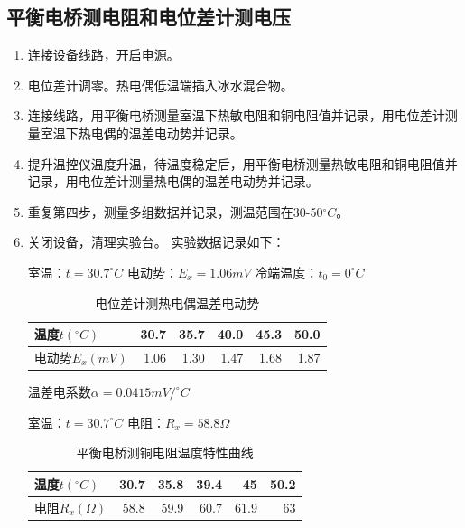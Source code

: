 \documentclass[11pt]{article}
\begin{document}
\subsection{平衡电桥测电阻和电位差计测电压}
\begin{enumerate}
    \item 连接设备线路，开启电源。
    \item 电位差计调零。热电偶低温端插入冰水混合物。
    \item 连接线路，用平衡电桥测量室温下热敏电阻和铜电阻值并记录，用电位差计测量室温下热电偶的温差电动势并记录。
    \item 提升温控仪温度升温，待温度稳定后，用平衡电桥测量热敏电阻和铜电阻值并记录，用电位差计测量热电偶的温差电动势并记录。
    \item 重复第四步，测量多组数据并记录，测温范围在30-50$^{\circ}C$。
    \item 关闭设备，清理实验台。
    \newline 实验数据记录如下：
   \begin{table}[H]
     \centering
     \caption{电位差计测热电偶温差电动势}
     室温：$t=30.7^{\circ}C$ \qquad 电动势：$E_{x}=1.06mV$ \qquad 冷端温度：$t_{0}=0^{\circ}C$
       \begin{center}
           \begin{tabular}{|l|r|r|r|r|r|}\hline
               温度$t(^{\circ}C)$ & 30.7  & 35.7  & 40.0  & 45.3  & 50.0  \\\hline
               电动势$E_{x}(mV)$ & 1.06  & 1.30  & 1.47  & 1.68  & 1.87  \\\hline
           \end{tabular}%
       \end{center}
       温差电系数$\alpha = 0.0415mV/^{\circ}C$
   \end{table}%
        \begin{table}[H]
          \centering
          \caption{平衡电桥测铜电阻温度特性曲线}
          室温：$t=30.7^{\circ}C$ \qquad 电阻：$R_{x}=58.8\Omega$
            \begin{center}
                \begin{tabular}{|l|r|r|r|r|r|}\hline
                    温度$t(^{\circ}C)$ & 30.7  & 35.8  & 39.4  & 45    & 50.2 \\\hline
                    电阻$R_{x}(\Omega)$ & 58.8  & 59.9  & 60.7  & 61.9  & 63 \\\hline
                \end{tabular}%

\end{center}
\end{table}
\end{enumerate}
\end{document}

